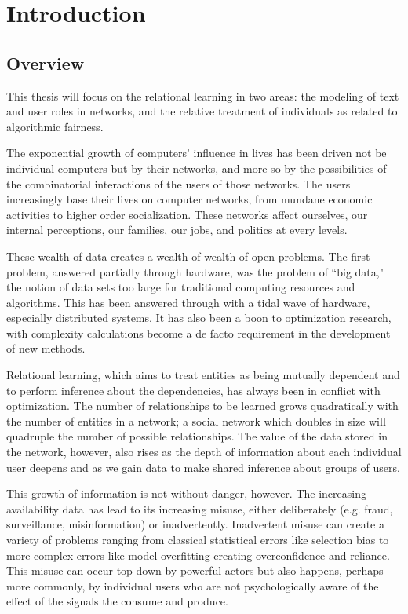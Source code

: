 \chapter{Introduction}

\section{Overview}

This thesis will focus on the relational learning in two areas: the modeling of text and user roles in networks, and the relative treatment of individuals as related to algorithmic fairness.  

The exponential growth of computers' influence in lives has been driven not be individual computers but by their networks, and more so by the possibilities of the combinatorial interactions of the users of those networks.  The users increasingly base their lives on computer networks, from mundane economic activities to higher order socialization.  These networks affect ourselves, our internal perceptions, our families, our jobs, and politics at every levels.

These wealth of data creates a wealth of wealth of open problems.  The first problem, answered partially through hardware, was the problem of ``big data," the notion of data sets too large for traditional computing resources and algorithms.  This has been answered through with a tidal wave of hardware, especially distributed systems.  It has also been a boon to optimization research, with complexity calculations become a de facto requirement in the development of new methods.

Relational learning, which aims to treat entities as being mutually dependent and to perform inference about the dependencies, has always been in conflict with optimization.  The number of relationships to be learned grows quadratically with the number of entities in a network; a social network which doubles in size will quadruple the number of possible relationships.  The value of the data stored in the network, however, also rises as the depth of information about each individual user deepens and as we gain data to make shared inference about groups of users.

This growth of information is not without danger, however.  The increasing availability data has lead to its increasing misuse, either deliberately (e.g. fraud, surveillance, misinformation) or inadvertently.  Inadvertent misuse can create a variety of problems ranging from classical statistical errors like selection bias to more complex errors like model overfitting creating overconfidence and reliance.  This misuse can occur top-down by powerful actors but also happens, perhaps more commonly, by individual users who are not psychologically aware of the effect of the signals the consume and produce.



